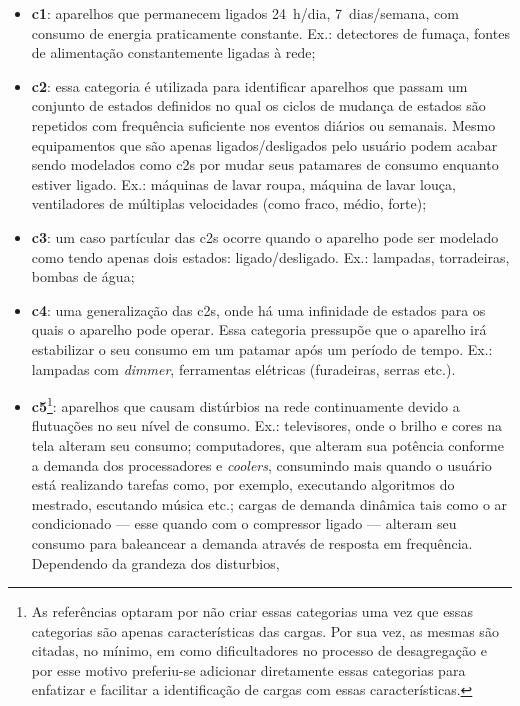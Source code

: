 \begin{itemize}
\item \textbf{\gls{c1}}: aparelhos que permanecem
ligados 24~h/dia, 7~dias/semana, com consumo de energia praticamente
constante. Ex.: detectores de fumaça, fontes de alimentação
constantemente ligadas à rede;
\item \textbf{\gls{c2}}: essa categoria é utilizada para identificar
aparelhos que passam um conjunto de estados definidos no qual os
ciclos de mudança de estados são repetidos com frequência suficiente
nos eventos diários ou semanais. Mesmo equipamentos que são apenas
ligados/desligados pelo usuário podem acabar sendo modelados como
\glspl{c2} por mudar seus patamares de consumo enquanto estiver
ligado. Ex.: máquinas de lavar roupa, máquina de lavar louça,
ventiladores de múltiplas velocidades (como fraco, médio, forte);
\item \textbf{\gls{c3}}: um caso partícular das \glspl{c2} ocorre
quando o aparelho pode ser modelado como tendo apenas dois estados:
ligado/desligado. Ex.: lampadas, torradeiras, bombas de água;
\item \textbf{\gls{c4}}: uma generalização das \glspl{c2}, onde
há uma infinidade de estados para os quais o aparelho pode operar.
Essa categoria pressupõe que o aparelho irá estabilizar o seu consumo
em um patamar após um período de tempo. Ex.: lampadas com
\emph{dimmer}, ferramentas elétricas (furadeiras, serras etc.).
\item \textbf{\gls{c5}}\footnote{As referências optaram por não
criar essas categorias uma vez que essas categorias são apenas
características das cargas. Por sua vez, as mesmas são citadas, no
mínimo, em \cite{nilm_zeifman_review_2011,nilm_liang_pt2_2010_40}
 como dificultadores no processo de desagregação e
por esse motivo preferiu-se adicionar diretamente essas categorias para
enfatizar e facilitar a identificação de cargas com essas
características.\label{fn:categoria_add}}: aparelhos que causam
distúrbios na rede continuamente devido a flutuações no seu nível de
consumo. Ex.: televisores, onde o brilho e cores na tela alteram seu
consumo; computadores, que alteram sua potência conforme a demanda dos
processadores e \emph{coolers}, consumindo mais quando o
usuário está realizando tarefas como, por exemplo, executando
algoritmos do mestrado, escutando música etc.;
cargas de demanda dinâmica tais como o ar condicionado --- esse quando com
o compressor ligado --- alteram seu consumo para baleancear a demanda
através de resposta em frequência. Dependendo da grandeza dos disturbios,

\end{itemize}
